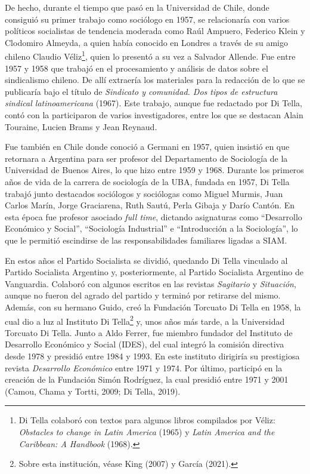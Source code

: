 De hecho, durante el tiempo que pasó en la Universidad de Chile, donde consiguió su primer trabajo como sociólogo en 1957, se relacionaría con varios políticos socialistas de tendencia moderada como Raúl Ampuero, Federico Klein y Clodomiro Almeyda, a quien había conocido en Londres a través de su amigo chileno Claudio Véliz\footnote{Di Tella colaboró con textos para algunos libros compilados por Véliz: \emph{Obstacles to change in Latin America} (1965) y \emph{Latin America and the Caribbean: A Handbook} (1968).}, quien lo presentó a su vez a Salvador Allende. Fue entre 1957 y 1958 que trabajó en el procesamiento y análisis de datos sobre el sindicalismo chileno. De allí extraería los materiales para la redacción de lo que se publicaría bajo el título de \emph{Sindicato y comunidad. Dos tipos de estructura sindical latinoamericana} (1967). Este trabajo, aunque fue redactado por Di Tella, contó con la participaron de varios investigadores, entre los que se destacan Alain Touraine, Lucien Brams y Jean Reynaud.

Fue también en Chile donde conoció a Germani en 1957, quien insistió en que retornara a Argentina para ser profesor del Departamento de Sociología de la Universidad de Buenos Aires, lo que hizo entre 1959 y 1968. Durante los primeros años de vida de la carrera de sociología de la UBA, fundada en 1957, Di Tella trabajó junto destacados sociólogos y sociólogas como Miguel Murmis, Juan Carlos Marín, Jorge Graciarena, Ruth Sautú, Perla Gibaja y Darío Cantón. En esta época fue profesor asociado \emph{full time}, dictando asignaturas como ``Desarrollo Económico y Social'', ``Sociología Industrial'' e ``Introducción a la Sociología'', lo que le permitió escindirse de las responsabilidades familiares ligadas a SIAM.

En estos años el Partido Socialista se dividió, quedando Di Tella vinculado al Partido Socialista Argentino y, posteriormente, al Partido Socialista Argentino de Vanguardia. Colaboró con algunos escritos en las revistas \emph{Sagitario} y \emph{Situación}, aunque no fueron del agrado del partido y terminó por retirarse del mismo. Además, con su hermano Guido, creó la Fundación Torcuato Di Tella en 1958, la cual dio a luz al Instituto Di Tella\footnote{Sobre esta institución, véase King (2007) y García (2021).} y, unos años más tarde, a la Universidad Torcuato Di Tella. Junto a Aldo Ferrer, fue miembro fundador del Instituto de Desarrollo Económico y Social (IDES), del cual integró la comisión directiva desde 1978 y presidió entre 1984 y 1993. En este instituto dirigiría su prestigiosa revista \emph{Desarrollo Económico} entre 1971 y 1974. Por último, participó en la creación de la Fundación Simón Rodríguez, la cual presidió entre 1971 y 2001 (Camou, Chama y Tortti, 2009; Di Tella, 2019).

